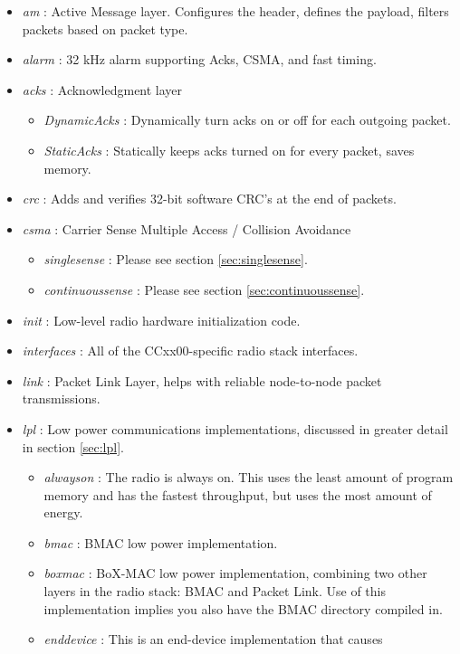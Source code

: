 \documentclass{article}
\begin{document}
\begin{itemize}
	\item \emph{am} : Active Message layer. Configures the header, defines the payload, filters packets
	based on packet type.
	\item \emph{alarm} : 32 kHz alarm supporting Acks, CSMA, and fast timing.
	\item \emph{acks} : Acknowledgment layer
	  \begin{itemize}
	    \item \emph{DynamicAcks} : Dynamically turn acks on or off for each outgoing packet.
	    \item \emph{StaticAcks} : Statically keeps acks turned on for every packet, saves memory.
	  \end{itemize}
	\item \emph{crc} : Adds and verifies 32-bit software CRC's at the end of packets.
	\item \emph{csma} : Carrier Sense Multiple Access / Collision Avoidance
	  \begin{itemize}
	    \item \emph{singlesense} : Please see section \ref{sec:singlesense}.
	    \item \emph{continuoussense} : Please see section \ref{sec:continuoussense}.
	  \end{itemize}
	\item \emph{init} : Low-level radio hardware initialization code.
	\item \emph{interfaces} : All of the CCxx00-specific radio stack interfaces.
	\item \emph{link} : Packet Link Layer, helps with reliable node-to-node packet transmissions.
	\item \emph{lpl} : Low power communications implementations, discussed in greater detail in section \ref{sec:lpl}.
	  \begin{itemize}
	    \item \emph{alwayson} : The radio is always on. This uses the least amount of 
	    program memory and has the fastest throughput, but uses the most amount of energy.
	    \item \emph{bmac} : BMAC \cite{bmac} low power implementation. 
	    \item \emph{boxmac} : BoX-MAC \cite{boxmac} low power implementation, combining two other
	    layers in the radio stack:  BMAC and Packet Link. Use of this implementation
	    implies you also have the BMAC directory compiled in.
	    \item \emph{enddevice} : This is an end-device implementation that causes

\end{itemize}
\end{itemize}
\end{document}
